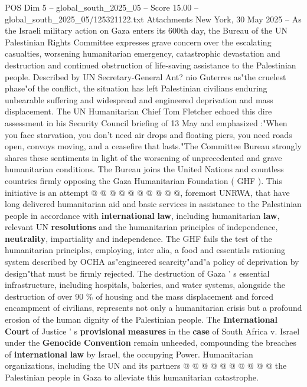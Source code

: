 \begin{textsample}{POS Dim 5 – global\_south\_2025\_05 – Score 15.00 – global\_south\_2025\_05/125321122.txt}  \label{ex:f5_pos_196}
Attachments New York, 30 May 2025 -- As the Israeli military action on Gaza enters its 600th day, the Bureau of the UN Palestinian Rights Committee expresses grave concern over the escalating casualties, worsening humanitarian emergency, catastrophic devastation and destruction and continued obstruction of life-saving assistance to the Palestinian people.
Described by UN Secretary-General Ant? nio Guterres as"the cruelest phase"of the conflict, the situation has left Palestinian civilians enduring unbearable suffering and widespread and engineered deprivation and mass displacement.
The UN Humanitarian Chief Tom Fletcher echoed this dire assessment in his Security Council briefing of 13 May and emphasized :"When you face starvation, you don't need air drops and floating piers, you need roads open, convoys moving, and a ceasefire that lasts."The Committee Bureau strongly shares these sentiments in light of the worsening of unprecedented and grave humanitarian conditions.
The Bureau joins the United Nations and countless countries firmly opposing the Gaza Humanitarian Foundation ( GHF ).
This initiative is an attempt @ @ @ @ @ @ @ @ @ @, foremost UNRWA, that have long delivered humanitarian aid and basic services in assistance to the Palestinian people in accordance with \textbf{international} \textbf{law}, including humanitarian \textbf{law}, relevant UN \textbf{resolutions} and the humanitarian principles of independence, \textbf{neutrality}, impartiality and independence.
The GHF fails the test of the humanitarian principles, employing, inter alia, a food and essentials rationing system described by OCHA as"engineered scarcity"and"a policy of deprivation by design"that must be firmly rejected.
The destruction of Gaza ' s essential infrastructure, including hospitals, bakeries, and water systems, alongside the destruction of over 90 \% of housing and the mass displacement and forced encampment of civilians, represents not only a humanitarian crisis but a profound erosion of the human dignity of the Palestinian people.
The \textbf{International} \textbf{Court} of Justice ' s \textbf{provisional} \textbf{measures} in the \textbf{case} of South Africa v.
Israel under the \textbf{Genocide} \textbf{Convention} remain unheeded, compounding the breaches of \textbf{international} \textbf{law} by Israel, the occupying Power.
Humanitarian organizations, including the UN and its partners @ @ @ @ @ @ @ @ @ @ the Palestinian people in Gaza to alleviate this humanitarian catastrophe.

\end{textsample}
